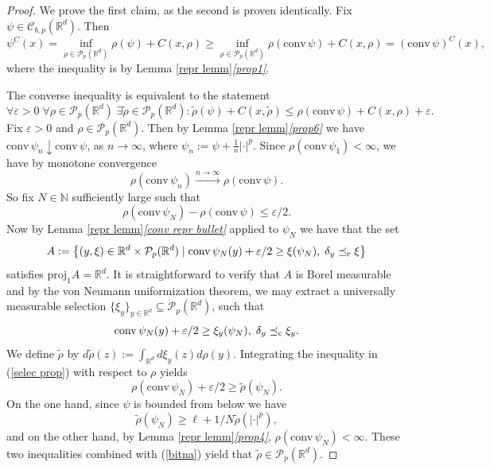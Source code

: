 \documentclass[reqno, a4paper]{amsart}
\newcommand{\lc}{\preceq_{\textnormal{c}}}
\newcommand{\conv}{\mathrm{conv}\,}
\newcommand{\PP}{\mathcal{P}}
\newcommand{\R}{\mathbb R}
\theoremstyle{definition}
\theoremstyle{definition}
\theoremstyle{definition}
\begin{document}
\begin{proof} We prove the first claim, as the second is proven identically.
    Fix $\psi\in{\mathcal{C}}_{b,p}(\R^d)$. Then
    $$ \psi^C(x)=\inf_{\rho\in\PP_p(\R^d)} \rho(\psi)+C(x,\rho)\geq \inf_{\rho\in\PP_p(\R^d)} \rho(\conv\psi)+C(x,\rho)=(\conv{\psi})^C(x),$$
    where the inequality is by Lemma \ref{repr lemm}\textit{\ref{prop1}}. 
    
    The converse inequality is equivalent to the statement
   \begin{equation} \label{nejjed}
        \forall\varepsilon>0\; \forall\rho\in\PP_p(\R^d) \;\exists\widetilde{\rho}\in\PP_p(\R^d):\widetilde{\rho}(\psi)+C(x,\widetilde{\rho})\leq {\rho}(\conv{\psi})+C(x,\rho)+\varepsilon.
   \end{equation}
    Fix $\varepsilon>0$ and $\rho\in\PP_p(\R^d).$ Then by Lemma \ref{repr lemm}\textit{\ref{prop6}} we have
    $\conv{\psi_n}\downarrow \conv{\psi}$, as $n\to\infty$, where $\psi_n:=\psi+\frac{1}{n}|\cdot|^p$. Since $\rho(\conv{\psi_1})<\infty$, we have by monotone convergence 
    $$\rho(\conv{\psi_n})\xrightarrow{n\to\infty}\rho(\conv{\psi}).$$
    So fix $N\in\mathbb N$ sufficiently large such that
   \begin{equation} \label{suff small}
        \rho(\conv{\psi_N})-\rho(\conv \psi)\leq \varepsilon/2.
   \end{equation}
    Now by Lemma \ref{repr lemm}\textit{\ref{conv repr bullet}} applied to $\psi_N$ we have that the set 
    $$A:=\left\{(y,\xi)\in \R^d\times\PP_p(\R^d) \mid \conv{\psi_N}(y)+\varepsilon/2\geq \xi(\psi_N), \;\delta_y \lc\xi\right\}$$
    satisfies $\text{proj}_1A=\R^d$. It is straightforward to verify that $A$ is Borel measurable and by the von Neumann uniformization theorem, we may extract a universally measurable selection $\{\xi_y\}_{y\in \R^d}\subseteq\PP_p(\R^d)$, such that
    \begin{equation} \label{selec prop}
        \conv{\psi_N}(y)+\varepsilon/2\geq \xi_y(\psi_N), \;\delta_y \lc\xi_y.
    \end{equation}
   We define $\widetilde{\rho}$ by $d\widetilde{\rho}(z):=\int_{\R^d} d\xi_y(z)d\rho(y).$ Integrating the inequality in (\ref{selec prop}) with respect to $\rho$ yields
   \begin{equation} \label{bitna}
       \rho(\conv{\psi_N})+\varepsilon/2\geq \widetilde{\rho}(\psi_N).
   \end{equation}
   On the one hand, since $\psi$ is bounded from below we have
$$\widetilde{\rho}(\psi_N)\geq \ell +1/N\widetilde{\rho}(|\cdot|^p),$$
and on the other hand, by Lemma \ref{repr lemm}\textit{\ref{prop4}}, 
$\rho(\conv{\psi_N}) <\infty.$
These two inequalities combined with (\ref{bitna}) yield that $\widetilde{\rho}\in\PP_p(\R^d)$.


\end{proof}
\end{document}
